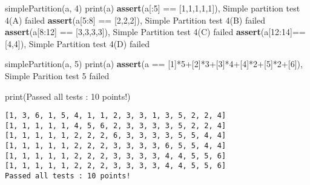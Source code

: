 \documentclass[
]{article}
\newenvironment{Shaded}{}{}
\newcommand{\BuiltInTok}[1]{\textcolor[rgb]{0.00,0.50,0.00}{#1}}
\newcommand{\ControlFlowTok}[1]{\textcolor[rgb]{0.00,0.44,0.13}{\textbf{#1}}}
\newcommand{\DecValTok}[1]{\textcolor[rgb]{0.25,0.63,0.44}{#1}}
\newcommand{\NormalTok}[1]{#1}
\newcommand{\OperatorTok}[1]{\textcolor[rgb]{0.40,0.40,0.40}{#1}}
\newcommand{\StringTok}[1]{\textcolor[rgb]{0.25,0.44,0.63}{#1}}
\begin{document}
\begin{Shaded}
\begin{Highlighting}[]
\NormalTok{simplePartition(a, }\DecValTok{4}\NormalTok{)}
\BuiltInTok{print}\NormalTok{(a)}
\ControlFlowTok{assert}\NormalTok{(a[:}\DecValTok{5}\NormalTok{] }\OperatorTok{==}\NormalTok{ [}\DecValTok{1}\NormalTok{,}\DecValTok{1}\NormalTok{,}\DecValTok{1}\NormalTok{,}\DecValTok{1}\NormalTok{,}\DecValTok{1}\NormalTok{]), }\StringTok{\textquotesingle{}Simple partition test 4(A) failed\textquotesingle{}}
\ControlFlowTok{assert}\NormalTok{(a[}\DecValTok{5}\NormalTok{:}\DecValTok{8}\NormalTok{] }\OperatorTok{==}\NormalTok{ [}\DecValTok{2}\NormalTok{,}\DecValTok{2}\NormalTok{,}\DecValTok{2}\NormalTok{]), }\StringTok{\textquotesingle{}Simple Partition test 4(B) failed\textquotesingle{}}
\ControlFlowTok{assert}\NormalTok{(a[}\DecValTok{8}\NormalTok{:}\DecValTok{12}\NormalTok{] }\OperatorTok{==}\NormalTok{ [}\DecValTok{3}\NormalTok{,}\DecValTok{3}\NormalTok{,}\DecValTok{3}\NormalTok{,}\DecValTok{3}\NormalTok{]), }\StringTok{\textquotesingle{}Simple Partition test 4(C) failed\textquotesingle{}}
\ControlFlowTok{assert}\NormalTok{(a[}\DecValTok{12}\NormalTok{:}\DecValTok{14}\NormalTok{]}\OperatorTok{==}\NormalTok{[}\DecValTok{4}\NormalTok{,}\DecValTok{4}\NormalTok{]), }\StringTok{\textquotesingle{}Simple Partition test 4(D) failed\textquotesingle{}}

\NormalTok{simplePartition(a, }\DecValTok{5}\NormalTok{)}
\BuiltInTok{print}\NormalTok{(a)}
\ControlFlowTok{assert}\NormalTok{(a }\OperatorTok{==}\NormalTok{ [}\DecValTok{1}\NormalTok{]}\OperatorTok{*}\DecValTok{5}\OperatorTok{+}\NormalTok{[}\DecValTok{2}\NormalTok{]}\OperatorTok{*}\DecValTok{3}\OperatorTok{+}\NormalTok{[}\DecValTok{3}\NormalTok{]}\OperatorTok{*}\DecValTok{4}\OperatorTok{+}\NormalTok{[}\DecValTok{4}\NormalTok{]}\OperatorTok{*}\DecValTok{2}\OperatorTok{+}\NormalTok{[}\DecValTok{5}\NormalTok{]}\OperatorTok{*}\DecValTok{2}\OperatorTok{+}\NormalTok{[}\DecValTok{6}\NormalTok{]), }\StringTok{\textquotesingle{}Simple Parition test 5 failed\textquotesingle{}}

\BuiltInTok{print}\NormalTok{(}\StringTok{\textquotesingle{}Passed all tests : 10 points!\textquotesingle{}}\NormalTok{)}
\end{Highlighting}
\end{Shaded}

\begin{verbatim}
[1, 3, 6, 1, 5, 4, 1, 1, 2, 3, 3, 1, 3, 5, 2, 2, 4]
[1, 1, 1, 1, 1, 4, 5, 6, 2, 3, 3, 3, 3, 5, 2, 2, 4]
[1, 1, 1, 1, 1, 2, 2, 2, 6, 3, 3, 3, 3, 5, 5, 4, 4]
[1, 1, 1, 1, 1, 2, 2, 2, 3, 3, 3, 3, 6, 5, 5, 4, 4]
[1, 1, 1, 1, 1, 2, 2, 2, 3, 3, 3, 3, 4, 4, 5, 5, 6]
[1, 1, 1, 1, 1, 2, 2, 2, 3, 3, 3, 3, 4, 4, 5, 5, 6]
Passed all tests : 10 points!
\end{verbatim}
\end{document}
